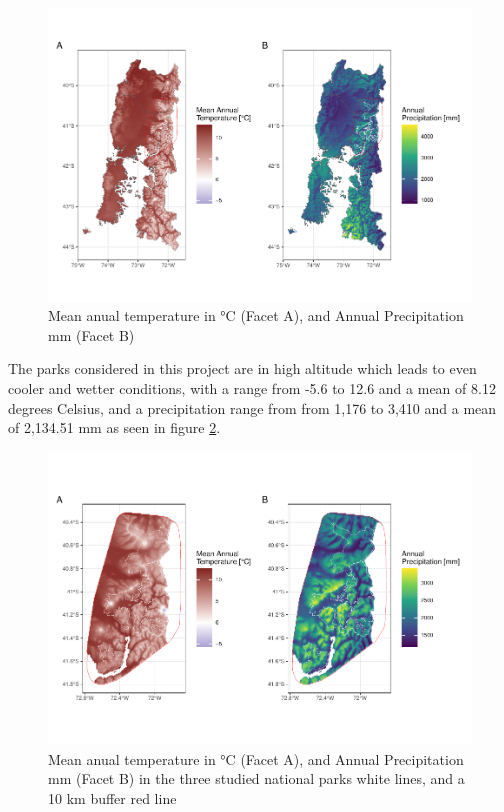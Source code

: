 \documentclass[]{article}
\begin{document}
\begin{figure}
\includegraphics[width=1\linewidth,height=1\textheight]{Review_and_climate_files/figure-latex/PresenteClima-1} \caption{Mean anual temperature in °C (Facet A), and Annual Precipitation mm (Facet B)}\label{fig:PresenteClima}
\end{figure}

The parks considered in this project are in high altitude which leads to even cooler and wetter conditions, with a range from -5.6 to 12.6 and a mean of 8.12 degrees Celsius, and a precipitation range from from 1,176 to 3,410 and a mean of 2,134.51 mm as seen in figure \ref{fig:PresenteClimaBuffer}.

\begin{figure}
\includegraphics[width=1\linewidth,height=1\textheight]{Review_and_climate_files/figure-latex/PresenteClimaBuffer-1} \caption{Mean anual temperature in °C (Facet A), and Annual Precipitation mm (Facet B) in the three studied national parks white lines, and a 10 km buffer red line}\label{fig:PresenteClimaBuffer}
\end{figure}
\end{document}
